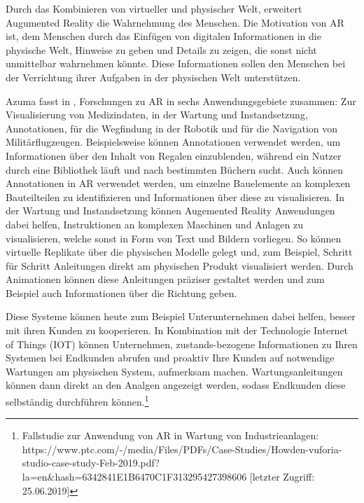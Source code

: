 \cite{Azuma.1997} Durch das Kombinieren von virtueller und physischer Welt, erweitert Augumented Reality die Wahrnehmung des Menschen. Die Motivation von AR ist, dem Menschen durch das Einfügen
von digitalen Informationen in die physische Welt, Hinweise zu geben und Details zu zeigen, die sonst nicht unmittelbar wahrnehmen könnte. Diese Informationen sollen den Menschen 
bei der Verrichtung ihrer Aufgaben in der physischen Welt unterstützen.

Azuma fasst in \cite{Azuma.1997}, Forschungen zu AR in sechs Anwendungsgebiete zusammen: Zur Visualisierung von Medizindaten, in der Wartung 
und Instandsetzung, Annotationen, für die Wegfindung in der Robotik und für die Navigation von Militärflugzeugen. Beispielsweise können Annotationen 
verwendet werden, um Informationen über den Inhalt von Regalen einzublenden, während ein Nutzer durch eine Bibliothek läuft und nach bestimmten Büchern sucht. %
Auch können Annotationen in AR verwendet werden, um einzelne Bauelemente an komplexen Bauteilteilen zu identifizieren und Informationen über diese zu visualisieren. 
In der Wartung und Instandsetzung können Augemented Reality Anwendungen dabei helfen, Instruktionen an komplexen Maschinen und Anlagen zu visualisieren, welche sonst in 
Form von Text und Bildern vorliegen. So können virtuelle Replikate über die physischen Modelle gelegt und, zum Beispiel, Schritt für Schritt Anleitungen direkt am physischen Produkt visualisiert werden. 
Durch Animationen können diese Anleitungen präziser gestaltet werden und zum Beispiel auch Informationen über die Richtung geben. 

Diese Systeme können heute zum Beispiel Unterunternehmen dabei helfen, besser mit ihren Kunden zu kooperieren. In Kombination mit der Technologie Internet of Things (IOT) können Unternehmen,
zustands-bezogene Informationen zu Ihren Systemen bei Endkunden abrufen und proaktiv Ihre Kunden auf notwendige Wartungen am physischen System, aufmerksam machen. Wartungsanleitungen können dann direkt 
an den Analgen angezeigt werden, sodass Endkunden diese selbständig durchführen können.\footnote{Fallstudie zur Anwendung von AR in Wartung von Industrieanlagen: https://www.ptc.com/-/media/Files/PDFs/Case-Studies/Howden-vuforia-studio-case-study-Feb-2019.pdf?la=en\&hash=6342841E1B6470C1F313295427398606 [letzter Zugriff: 25.06.2019]}

